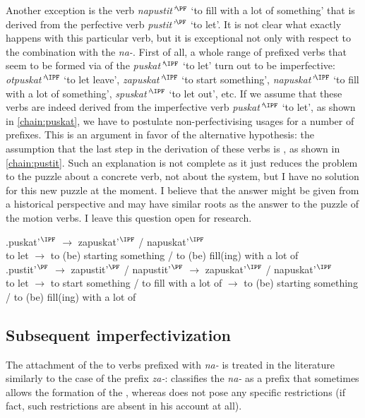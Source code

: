 Another exception is the verb \textit{napustit'}$^{\PF}$ `to fill with a lot of something' that is derived from the perfective verb \textit{pustit'}$^{\PF}$ `to let'. It is not clear what exactly happens with this particular verb, but it is exceptional not only with respect to the combination with the  \textit{na-}. First of all, a whole range of prefixed verbs that seem to be formed via  of the  \textit{puskat'}$^{\IPF}$ `to let' turn out to be imperfective: \textit{otpuskat'}$^{\IPF}$ `to let leave', \textit{zapuskat'}$^{\IPF}$ `to start something', \textit{napuskat'}$^{\IPF}$ `to fill with a lot of something', \textit{spuskat'}$^{\IPF}$ `to let out', etc. If we assume that these verbs are indeed derived from the imperfective verb \textit{puskat'}$^{\IPF}$ `to let', as shown in \ref{chain:puskat}, we have to postulate non-perfectivising usages for a number of prefixes. This is an argument in favor of the alternative hypothesis: the assumption that the last step in the derivation of these verbs is , as shown in \ref{chain:pustit}. Such an explanation is not complete as it just reduces the problem to the puzzle about a concrete verb, not about the  system, but I have no solution for this new puzzle at the moment. I believe that the answer might be given from a historical perspective and may have similar roots as the answer to the puzzle of the motion verbs. I leave this question open for  research.

\exg.puskat'$^{\IPF}$ $\rightarrow$ zapuskat'$^{\IPF}$ / napuskat'$^{\IPF}$ \label{chain:puskat}\\
{to let} $\rightarrow$ {to (be) starting something} / {to (be) fill(ing) with a lot of}\\

\exg.pustit'$^{\PF}$ $\rightarrow$ zapustit'$^{\PF}$ / napustit'$^{\PF}$ $\rightarrow$ zapuskat'$^{\IPF}$ / napuskat'$^{\IPF}$ \label{chain:pustit}\\
{to let} $\rightarrow$ {to start something} / {to fill with a lot of} $\rightarrow$ {to (be) starting something} / {to (be) fill(ing) with a lot of}\\

\subsection{Subsequent imperfectivization}
The attachment of the  to verbs prefixed with \textit{na-} is treated in the literature similarly to the case of the  prefix \textit{za-}: \citet[230]{Svenonius:04b} classifies the  \textit{na-} as a prefix that sometimes allows the formation of the , whereas \citet{Tatevosov:09} does not pose any specific restrictions (if fact, such restrictions are absent in his account at all).


